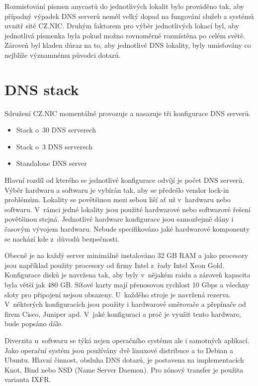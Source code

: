 \documentclass[thesis=M,czech]{src/FITthesis}[2019/12/23]
\begin{document}
Rozmisťování písmen anycastů do jednotlivých lokalit bylo prováděno tak, aby případný výpadek DNS serverů neměl velký dopad na fungování služeb a systémů uvnitř sítě CZ.NIC. Druhým faktorem pro výběr jednotlivých lokací byl, aby jednotlivá písmenka byla pokud možno rovnoměrně rozmístěna po celém světě. Zároveň byl kladen důraz na to, aby jednotlivé DNS lokality, byly umisťovány co nejblíže významnému původci dotazů.   




\section{DNS stack}
Sdružení CZ.NIC momentálně provozuje a nasazuje tři konfigurace DNS serverů. 

\begin{itemize}
	\item Stack o~30 DNS serverech
	\item Stack o~3 DNS serverech 
	\item Standalone DNS server
\end{itemize}

Hlavní rozdíl od kterého se jednotlivé konfigurace odvíjí je počet DNS serverů. Výběr hardwaru a softwaru je vybírán tak, aby se předešlo vendor lock-in problémům. Lokality se povětšinou mezi sebou liší ať už v~hardwaru nebo softwaru. V~rámci jedné lokality jsou použité hardwarové nebo softwarové řešení povětšinou stejná. Jednotlivé hardware konfigurace jsou samozřejmě dány i časovým vývojem hardwaru. Nebude specifikováno jaké hardwarové komponenty se nachází kde z~důvodů bezpečnosti.

Obecně je na každý server minimálně instalováno 32 GB RAM a jako procesory jsou například použity procesory od firmy Intel z~řady Intel Xeon Gold. Konfigurace disků je navržena tak, aby byly v~nějakém raidu a zároveň kapacita byla větší jak 480 GB. Síťové karty mají přenosovou rychlost 10 Gbps a všechny sloty pro připojení nejsou obsazeny. U~každého stroje je navržená rezerva. V~některých konfiguracích jsou použity i hardwarové směrovače a přepínače od firem Cisco, Juniper apd. V~jaké konfiguraci a proč je využit tento hardware, bude popsáno dále.

Diverzita u~softwaru se týká nejen operačního systému ale i samotných aplikací. Jako operační systém jsou používány dvě linuxové distribuce a to Debian a Ubuntu. Hlavní činnost, obsluha DNS dotazů, je postavena na implementacích Knot, Bind nebo NSD (Name Server Daemon). Pro zónový transfer je použita varianta IXFR.
\end{document}
